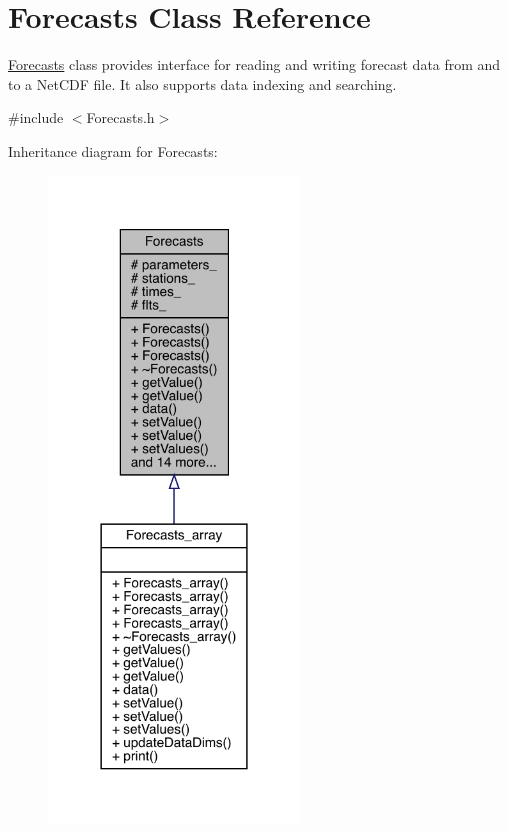 \hypertarget{class_forecasts}{}\section{Forecasts Class Reference}
\label{class_forecasts}


\mbox{\hyperlink{class_forecasts}{Forecasts}} class provides interface for reading and writing forecast data from and to a Net\+C\+DF file. It also supports data indexing and searching.  




{\ttfamily \#include $<$Forecasts.\+h$>$}



Inheritance diagram for Forecasts\+:
\nopagebreak
\begin{figure}[H]
\begin{center}
\leavevmode
\includegraphics[width=189pt]{class_forecasts__inherit__graph}
\end{center}
\end{figure}



